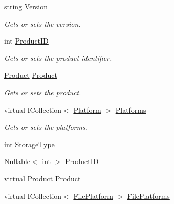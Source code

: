 \begin{DoxyCompactItemize}
string \hyperlink{class_open_1_1_g_i_1_1hypermart_1_1_models_1_1_file_a59b1cbe55394fce55d55200ea7e55cae}{Version}
\begin{DoxyCompactList}\small\item\em Gets or sets the version. \end{DoxyCompactList}\item 
int \hyperlink{class_open_1_1_g_i_1_1hypermart_1_1_models_1_1_file_a7f0a3da01808662b23635d9b9b6f6848}{Product\+ID}
\begin{DoxyCompactList}\small\item\em Gets or sets the product identifier. \end{DoxyCompactList}\item 
\hyperlink{class_open_1_1_g_i_1_1hypermart_1_1_models_1_1_product}{Product} \hyperlink{class_open_1_1_g_i_1_1hypermart_1_1_models_1_1_file_a4b8d3f1af1802269e9e06285f9bf81b3}{Product}
\begin{DoxyCompactList}\small\item\em Gets or sets the product. \end{DoxyCompactList}\item 
virtual I\+Collection$<$ \hyperlink{class_open_1_1_g_i_1_1hypermart_1_1_models_1_1_platform}{Platform} $>$ \hyperlink{class_open_1_1_g_i_1_1hypermart_1_1_models_1_1_file_a7cf38ed851b70df6af9b0606c4d744ed}{Platforms}
\begin{DoxyCompactList}\small\item\em Gets or sets the platforms. \end{DoxyCompactList}\item 
int \hyperlink{class_open_1_1_g_i_1_1hypermart_1_1_models_1_1_file_ab4ac8af085696918a7a4e1765639066d}{Storage\+Type}
\item 
Nullable$<$ int $>$ \hyperlink{class_open_1_1_g_i_1_1hypermart_1_1_models_1_1_file_ad0b974d38df4491ce90d1d5e884a56a8}{Product\+ID}
\item 
virtual \hyperlink{class_open_1_1_g_i_1_1hypermart_1_1_models_1_1_product}{Product} \hyperlink{class_open_1_1_g_i_1_1hypermart_1_1_models_1_1_file_a7a2d45936082be844aa8528b298a2d6a}{Product}
\item 
virtual I\+Collection$<$ \hyperlink{class_open_1_1_g_i_1_1hypermart_1_1_models_1_1_file_platform}{File\+Platform} $>$ \hyperlink{class_open_1_1_g_i_1_1hypermart_1_1_models_1_1_file_ac075b378d09c288deda822c0ea6b854c}{File\+Platforms}
\end{DoxyCompactItemize}


